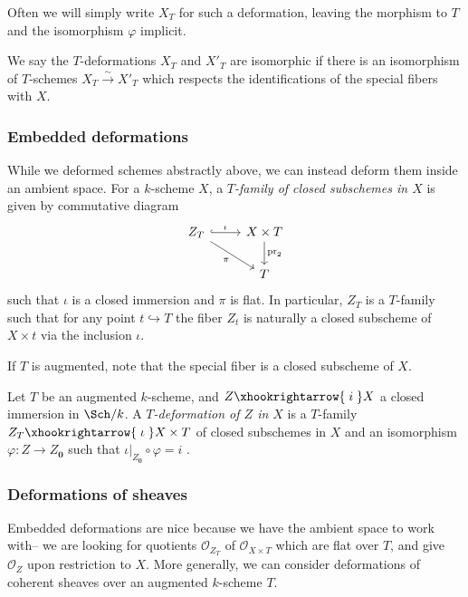Often we will simply write \(X_T\) for such a deformation, leaving the
morphism to \(T\) and the isomorphism \(\varphi\) implicit. 

We say the \(T\)-deformations \(X_T\) and \(X'_T\) are isomorphic if there is
an isomorphism of \(T\)-schemes \(X_T\xrightarrow{\sim} X'_T\) which respects
the identifications of the special fibers with \(X\).

\subsubsection{Embedded deformations}
While we deformed schemes abstractly above, we can instead deform them inside an
ambient space. For a \(k\)-scheme \(X\), a \textit{\(T\)-family of closed
subschemes in \(X\)} is given by commutative diagram  
\[\begin{tikzcd}
    Z_T \arrow[r,"\iota",hook] \arrow[rd,"\pi"'] 
    & X\times T \arrow[d,"\text{pr}_2"] \\ 
    & T
\end{tikzcd}\] 
such that \(\iota\) is a closed immersion and \(\pi\) is flat. In particular,
\(Z_T\) is a \(T\)-family such that for any point \(t\hookrightarrow T\) the
fiber \(Z_t\) is naturally a closed subscheme of \(X\times t\) via the
inclusion \(\iota\). 

If \(T\) is augmented, note that the special fiber is a closed subscheme of \(X\).

\begin{definition} \label{def-embdef}
    Let \(T\) be an augmented \(k\)-scheme, and \(Z\xhookrightarrow{\;i\;}X\) a
    closed immersion in \(\Sch/k\). A \textit{\(T\)-deformation of \(Z\) in
    \(X\)} is a \(T\)-family \(Z_T\xhookrightarrow{\;\iota\;} X\times T\) 
    of closed subschemes in \(X\) and an isomorphism \(\varphi: Z\rightarrow
    Z_\mathbold{0}\) such that \(\iota|_{Z_\mathbold{0}}\circ \varphi = i\) .
\end{definition}

\subsubsection{Deformations of sheaves} Embedded deformations are nice
because we have the ambient space to work with-- we are looking for quotients
\(\mathscr{O}_{Z_T}\) of \(\mathscr{O}_{X\times T}\) which are flat over \(T\),
and give \(\mathscr{O}_Z\) upon restriction to \(X\). More generally, we can
consider deformations of coherent sheaves over an augmented \(k\)-scheme \(T\).

